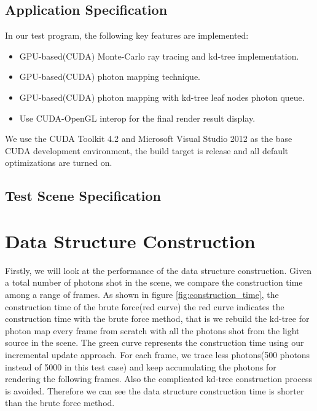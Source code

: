 \subsection{Application Specification}

In our test program, the following key features are implemented: 

\begin{itemize}

\item{GPU-based(CUDA) Monte-Carlo ray tracing and kd-tree implementation.}

\item{GPU-based(CUDA) photon mapping technique. } 

\item{GPU-based(CUDA) photon mapping with kd-tree leaf nodes photon queue.} 

\item{Use CUDA-OpenGL interop for the final render result display. }

\end{itemize}

We use the CUDA Toolkit 4.2 and Microsoft Visual Studio 2012 as the base CUDA development environment, the build target is release and all default optimizations are turned on. 

\subsection{Test Scene Specification}


\section{Data Structure Construction}
\label{sec:build_time}

Firstly, we will look at the performance of the data structure construction. Given a total number of photons shot in the scene, we compare the construction time among a range of frames. As shown in figure \ref{fig:construction_time}, the construction time of the brute force(red curve)  the red curve indicates the construction time with the brute force method, that is we rebuild the kd-tree for photon map every frame from scratch with all the photons shot from the light source in the scene. The green curve represents the construction time using our incremental update approach. For each frame, we trace less photons(500 photons instead of 5000 in this test case) and keep accumulating the photons for rendering the following frames. Also the complicated kd-tree construction process is avoided. Therefore we can see the data structure construction time is shorter than the brute force method. 


